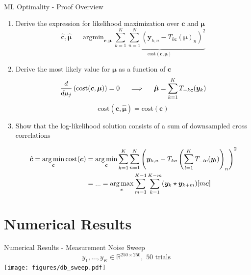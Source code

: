 \documentclass[10pt,xcolor=dvipsnames]{beamer}
\newcommand\lstar{\mkern4mu{\star}\mkern4mu}
\DeclareMathOperator*{\argmin}{\arg\min}
\DeclareMathOperator*{\argmax}{\arg\max}
\begin{document}
\begin{frame}{ML Optimality - Proof Overview}
  \begin{enumerate}
  \item Derive the expression for likelihood maximization over $\bm{c}$ and $\bm{\mu}$
    $$
      \hat{\bm{c}}, \hat{\bm{\mu}} =
      \argmin_{\bm{c}, \bm{\mu}}
      \underbrace{\sum_{k=1}^K \sum_{n=1}^N (\bm{y}_{k,n} - T_{k\bm{c}}(\bm{\mu})_n)^2}_{\text{cost}(\bm{c}, \bm{\mu})}
    $$
  \item Derive the most likely value for $\bm{\mu}$ as a function of $\bm{c}$
    $$
      \frac{d}{d\mu_j}\left(\text{cost}(\bm{c}, \bm{\mu})\right) = 0 \nonumber
      \hspace{0.5cm} \Longrightarrow \hspace{0.5cm}
      \hat{\bm{\mu}} = \sum_{k=1}^K T_{-k\bm{c}}(\bm{y}_k)
    $$
      $$\text{cost}(\bm{c}, \hat{\bm{\mu}}) = \text{cost}(\bm{c})$$
    \item Show that the log-likelihood solution consists of a sum of downsampled cross correlations

      $$\begin{aligned}
      \hat{\bm{c}} = \argmin_{\bm{c}} \text{cost}(\bm{c})
      &=\argmin_{\bm{c}}\sum_{k=1}^K \sum_{n=1}^N \left(\bm{y}_{k,n} - T_{k\bm{c}}\left(\sum_{l=1}^K T_{-l\bm{c}}(\bm{y}_l)\right)_n\right)^2 \\
      &= ... = \argmax_{\bm{c}} \sum_{m=1}^{K-1} \sum_{k=1}^{K-m} (\bm{y}_k \lstar \bm{y}_{k+m})[m\bm{c}]
      \end{aligned}$$

  \end{enumerate}
\end{frame}


\section{Numerical Results}

\begin{frame}{Numerical Results - Measurement Noise Sweep}
  $$y_1, ..., y_K \in \mathbb{R}^{250 \times 250}, \text{ 50 trials }$$
  \texttt{[image: figures/db\_sweep.pdf]}
\end{frame}

\end{document}
